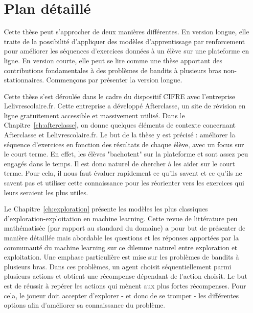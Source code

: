 \section*{Plan détaillé}

Cette thèse peut s'approcher de deux manières différentes. En version longue, elle traite de la possibilité d'appliquer des modèles d'apprentissage par renforcement pour améliorer les séquences d'exercices données à un élève sur une plateforme en ligne. En version courte, elle peut se lire comme une thèse apportant des contributions fondamentales à des problèmes de bandits à plusieurs bras non-stationnaires. Commençons par présenter la version longue.

Cette thèse s'est déroulée dans le cadre du dispositif CIFRE avec l'entreprise Lelivrescolaire.fr. Cette entreprise a développé Afterclasse, un site de révision en ligne gratuitement accessible et massivement utilisé. Dans le Chapitre~\ref{ch:afterclasse}, on donne quelques éléments de contexte concernant Afterclasse et Lelivrescolaire.fr. Le but de la thèse y est précisé : améliorer la séquence d'exercices en fonction des résultats de chaque élève, avec un focus sur le court terme. En effet, les élèves "bachotent" sur la plateforme et sont assez peu engagés dans le temps. Il est donc naturel de chercher à les aider sur le court terme. Pour cela, il nous faut évaluer rapidement ce qu'ils savent et ce qu'ils ne savent pas et utiliser cette connaissance pour les réorienter vers les exercices qui leurs seraient les plus utiles.

Le Chapitre~\ref{ch:exploration} présente les modèles les plus classiques d'exploration-exploitation en machine learning. Cette revue de littérature peu mathématisée (par rapport au standard du domaine) a pour but de présenter de manière détaillée mais abordable les questions et les réponses apportées par la communauté du machine learning sur ce dilemme naturel entre exploration et exploitation. Une emphase particulière est mise sur les problèmes de bandits à plusieurs bras. Dans ces problèmes, un agent choisit séquentiellement parmi plusieurs actions et obtient une récompense dépendant de l'action choisit. Le but est de réussir à repérer les actions qui mènent aux plus fortes récompenses. Pour cela, le joueur doit accepter d'explorer - et donc de se tromper - les différentes options afin d'améliorer sa connaissance du problème. 

